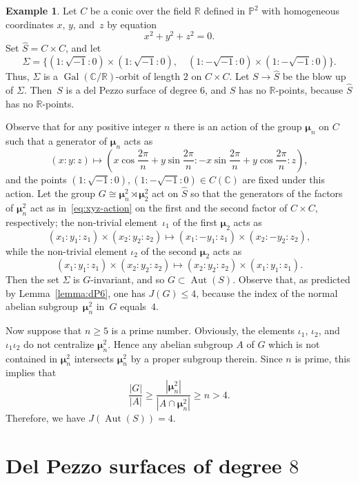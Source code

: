 \documentclass[12pt]{amsart}
\newcounter{cequation}[section]
\theoremstyle{definition}
\newtheorem{example}[cequation]{Example}
\theoremstyle{remark}
\newcommand{\CC}{\mathbb{C}}
\newcommand{\RR}{\mathbb{R}}
\newcommand{\PP}{\mathbb{P}}
\newcommand{\mumu}{{\boldsymbol{\mu}}}
\newcommand{\Aut}{\operatorname{Aut}}
\newcommand{\Gal}{\operatorname{Gal}}
\def \ge {\geqslant}
\def \le {\leqslant}
\begin{document}
\begin{example}\label{example:dP6}
Let $C$ be a conic over the field $\RR$ defined in $\PP^2$
with homogeneous coordinates $x$, $y$, and~$z$ by equation
\begin{equation}\label{eq:xyz}
x^2+y^2+z^2=0.
\end{equation}
Set $\hat{S}=C\times C$, and let
$$
\Sigma=\{(1:\sqrt{-1}:0)\times (1:\sqrt{-1}:0),\quad (1:-\sqrt{-1}:0)\times (1:-\sqrt{-1}:0)\}.
$$
Thus, $\Sigma$ is a $\Gal(\CC/\RR)$-orbit of length $2$ on $C\times C$. Let $S\to\hat{S}$ be the blow up of
$\Sigma$. Then~$S$ is a del Pezzo surface of degree $6$, and $S$ has no $\RR$-points, because $\hat{S}$ has no $\RR$-points.

Observe that for any positive integer $n$ there is an action of the group $\mumu_n$ on $C$ such that a generator of $\mumu_n$ acts as
\begin{equation}\label{eq:xyz-action}
(x:y:z)\mapsto \left(x\cos\frac{2\pi}{n}+y\sin\frac{2\pi}{n}: -x\sin\frac{2\pi}{n}+y\cos\frac{2\pi}{n}:z\right),
\end{equation}
and the points $(1:\sqrt{-1}:0), (1:-\sqrt{-1}:0)\in C(\CC)$
are fixed under this action.
Let the group $G\cong\mumu_n^2\rtimes\mumu_2^2$ act on
$\hat{S}$ so that the generators of the factors of $\mumu_n^2$ act
as in~\eqref{eq:xyz-action}
on the first and the second factor of $C\times C$, respectively;
the non-trivial element~$\iota_1$ of the first $\mumu_2$ acts as
$$
(x_1:y_1:z_1)\times (x_2:y_2:z_2)\mapsto (x_1:-y_1:z_1)\times (x_2:-y_2:z_2),
$$
while the non-trivial element $\iota_2$ of the second $\mumu_2$ acts as
$$
(x_1:y_1:z_1)\times (x_2:y_2:z_2)\mapsto (x_2:y_2:z_2)\times (x_1:y_1:z_1).
$$
Then the set $\Sigma$ is $G$-invariant, and so $G\subset\Aut(S)$.
Observe that, as predicted by Lemma~\ref{lemma:dP6}, one has $J(G)\le 4$, because the index of the normal
abelian subgroup~$\mumu_n^2$ in~$G$ equals~$4$.

Now suppose that $n\ge 5$ is a prime number.
Obviously, the elements $\iota_1$, $\iota_2$, and $\iota_1\iota_2$
do not centralize $\mumu_n^2$. Hence any abelian subgroup $A$ of $G$ which
is not contained in $\mumu_n^2$ intersects
$\mumu_n^2$ by a proper subgroup therein. Since $n$ is prime,
this implies that
$$
\frac{|G|}{|A|}\ge \frac{|\mumu_n^2|}{|A\cap\mumu_n^2|}\ge n>4.
$$
Therefore, we have $J(\Aut(S))=4$.
\end{example}


\section{Del Pezzo surfaces of degree $8$}
\label{section:dP8}
\end{document}

